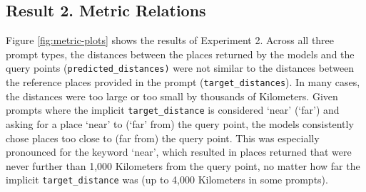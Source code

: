 



\subsection{Result 2. Metric Relations}

Figure \ref{fig:metric-plots} shows the results of Experiment 2.
Across all three prompt types, the distances between the places returned by the models and the query points (\texttt{predicted{\_}distances)} were not similar to the distances between the reference places provided in the prompt (\texttt{target{\_}distances}).
In many cases, the distances were too large or too small by thousands of Kilometers.
%
Given prompts where the implicit \texttt{target{\_}distance} is considered `near' (`far') and asking for a place `near' to (`far' from) the query point, the models consistently chose places too close to (far from) the query point.
This was especially pronounced for the keyword `near', which resulted in places returned that were never further than 1,000 Kilometers from the query point, no matter how far the implicit \texttt{target{\_}distance} was (up to 4,000 Kilometers in some prompts).



